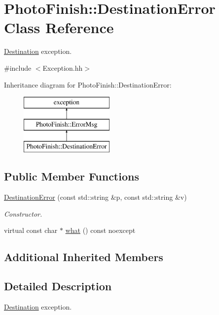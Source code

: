 \hypertarget{class_photo_finish_1_1_destination_error}{}\section{Photo\+Finish\+:\+:Destination\+Error Class Reference}
\label{class_photo_finish_1_1_destination_error}


\hyperlink{class_photo_finish_1_1_destination}{Destination} exception.  




{\ttfamily \#include $<$Exception.\+hh$>$}

Inheritance diagram for Photo\+Finish\+:\+:Destination\+Error\+:\begin{figure}[H]
\begin{center}
\leavevmode
\includegraphics[height=3.000000cm]{class_photo_finish_1_1_destination_error}
\end{center}
\end{figure}
\subsection*{Public Member Functions}
\begin{DoxyCompactItemize}
\item 
\hyperlink{class_photo_finish_1_1_destination_error_a64bc7a5b20974a90fa479c0f2142977f}{Destination\+Error} (const std\+::string \&p, const std\+::string \&v)
\begin{DoxyCompactList}\small\item\em Constructor. \end{DoxyCompactList}\item 
virtual const char $\ast$ \hyperlink{class_photo_finish_1_1_destination_error_af1d3accc402e1a286d51896cf4f85449}{what} () const noexcept
\end{DoxyCompactItemize}
\subsection*{Additional Inherited Members}


\subsection{Detailed Description}
\hyperlink{class_photo_finish_1_1_destination}{Destination} exception. 

